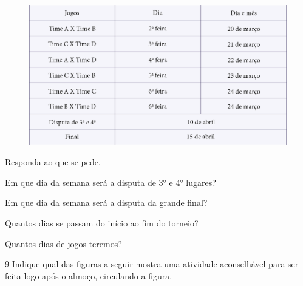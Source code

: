 \begin{figure}[htpb!]
\includegraphics[width=.95\textwidth]{./media/image58.png}
\end{figure}

Responda ao que se pede.

\begin{escolha}[itemsep=-5pt]
\item Em que dia da semana será a disputa de 3° e 4° lugares?

\item Em que dia da semana será a disputa da grande final?

\item Quantos dias se passam do início ao fim do torneio?

\item Quantos dias de jogos teremos?
\end{escolha}


\num{9} Indique qual das figuras a seguir mostra uma atividade aconselhável para
ser feita logo após o almoço, circulando a figura.


